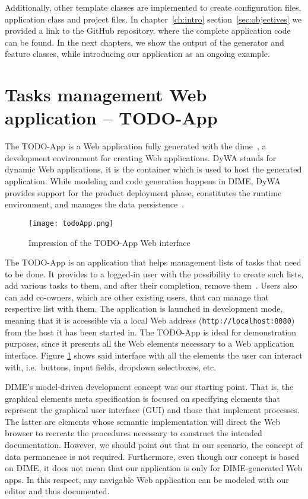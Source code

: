 Additionally, other template classes are implemented to create configuration files, application class and project files. In chapter~\ref{ch:intro} section~\ref{sec:objectives} we provided a link to the GitHub repository, where the complete application code can be found. In the next chapters, we show the output of the generator and feature classes, while introducing our application as an ongoing example.

\section{Tasks management Web application -- TODO-App}\label{sec:todoApp}

The TODO-App is a Web application fully generated with the \gls{dime}~\cite{bosselmann-et_al}, a development environment for creating Web applications. DyWA stands for dynamic Web applications, it is the container which is used to host the generated application. While modeling and code generation happens in DIME, DyWA provides support for the product deployment phase, constitutes the runtime environment, and manages the data persistence~\cite{bosselmann-et_al}.

\begin{figure}[h]
    \centering
    \texttt{[image: todoApp.png]}
    \caption{Impression of the TODO-App Web interface}
    \label{fig:todoApp}
\end{figure}

The TODO-App is an application that helps management lists of tasks that need to be done. It provides to a logged-in user with the possibility to create such lists, add various tasks to them, and after their completion, remove them~\cite{bosselmann-et_al}. Users also can add co-owners, which are other existing users, that can manage that respective list with them. The application is launched in development mode, meaning that it is accessible via a local Web address (\lstinline{http://localhost:8080}) from the host it has been started in. The TODO-App is ideal for demonstration purposes, since it presents all the Web elements necessary to a Web application interface. Figure \ref{fig:todoApp} shows said interface with all the elements the user can interact with, i.e.~buttons, input fields, dropdown selectboxes, etc.

DIME's model-driven development concept was our starting point. That is, the graphical elements meta specification is focused on specifying elements that represent the graphical user interface (GUI) and those that implement processes. The latter are elements whose semantic implementation will direct the Web browser to recreate the procedures necessary to construct the intended documentation. However, we should point out that in our scenario, the concept of data permanence is not required. Furthermore, even though our concept is based on DIME, it does not mean that our application is only for DIME-generated Web apps. In this respect, any navigable Web application can be modeled with our editor and thus documented.